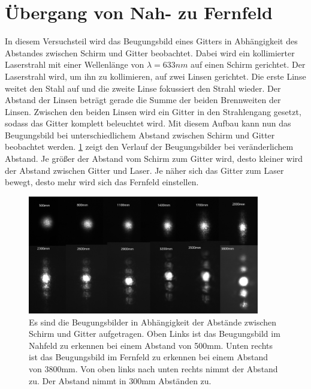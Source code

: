 \section{Übergang von Nah- zu Fernfeld}
In diesem Versuchsteil wird das Beugungsbild eines Gitters in Abhängigkeit des Abstandes zwischen Schirm und Gitter beobachtet. Dabei wird ein kollimierter Laserstrahl mit einer Wellenlänge von $\lambda = 633 nm$ auf einen Schirm gerichtet. Der Laserstrahl wird, um ihn zu kollimieren, auf zwei Linsen gerichtet. Die erste Linse weitet den Stahl auf und die zweite Linse fokussiert den Strahl wieder. Der Abstand der Linsen beträgt gerade die Summe der beiden Brennweiten der Linsen. Zwischen den beiden Linsen wird ein Gitter in den Strahlengang gesetzt, sodass das Gitter komplett beleuchtet wird. Mit diesem Aufbau kann nun das Beugungsbild bei unterschiedlichem Abstand zwischen Schirm und Gitter beobachtet werden. \cref{alle} zeigt den Verlauf der Beugungsbilder bei veränderlichem Abstand. Je größer der Abstand vom Schirm zum Gitter wird, desto kleiner wird der Abstand zwischen Gitter und Laser. Je näher sich das Gitter zum Laser bewegt, desto mehr wird sich das Fernfeld einstellen.
\begin{subfigure}[c]{0.7\textwidth}
	\includegraphics[width=0.9\textwidth]{alleabstande.png}
	\caption{Es sind die Beugungsbilder in Abhängigkeit der Abstände zwischen Schirm und Gitter aufgetragen. Oben Links ist das Beugungsbild im Nahfeld zu erkennen bei einem Abstand von 500mm. Unten rechts ist das Beugungsbild im Fernfeld zu erkennen bei einem Abstand von 3800mm. Von oben links nach unten rechts nimmt der Abstand zu. Der Abstand nimmt in 300mm Abständen zu.}
	\label{alle}
\end{subfigure}
